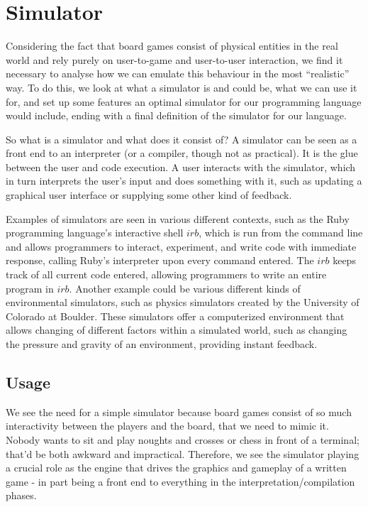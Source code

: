 \section{Simulator}
\label{sec:simulator}
Considering the fact that board games consist of physical entities in the real
world and rely purely on user-to-game and user-to-user interaction, we find it
necessary to analyse how we can emulate this behaviour in the most ``realistic''
way. To do this, we look at what a simulator is and could be, what we can use it
for, and set up some features an optimal simulator for our programming language
would include, ending with a final definition of the simulator for our language.

So what is a simulator and what does it consist of? A simulator can be seen as a
front end to an interpreter (or a compiler, though not as practical). It is the
glue between the user and code execution. A user interacts with the simulator,
which in turn interprets the user's input and does something with it, such as
updating a graphical user interface or supplying some other kind of feedback.

Examples of simulators are seen in various different contexts, such as the
Ruby\cite{rubyLang} programming language's interactive shell $irb$, which is run
from the command line and allows programmers to interact, experiment, and write
code with immediate response, calling Ruby's interpreter upon every command
entered. The $irb$ keeps track of all current code entered, allowing programmers
to write an entire program in $irb$. Another example could be various different
kinds of environmental simulators, such as physics simulators created by the
University of Colorado at Boulder\cite{colSim}. These simulators offer a
computerized environment that allows changing of different factors within a
simulated world, such as changing the pressure and gravity of an environment,
providing instant feedback.

\subsection{Usage}
We see the need for a simple simulator because board games consist of so much
interactivity between the players and the board, that we need to mimic it.
Nobody wants to sit and play noughts and crosses or chess in front of a
terminal; that'd be both awkward and impractical. Therefore, we see the
simulator playing a crucial role as the engine that drives the graphics and
gameplay of a written game - in part being a front end to everything in the
interpretation/compilation phases.

